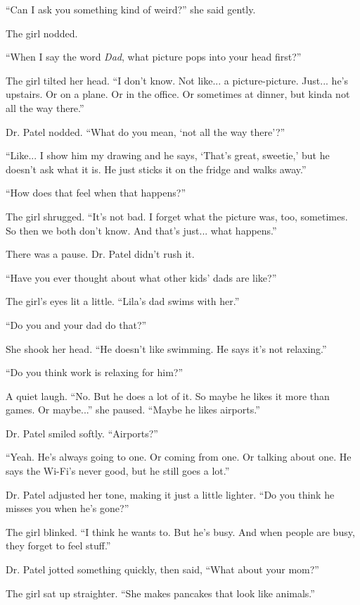``Can I ask you something kind of weird?'' she said gently.

The girl nodded.

``When I say the word \textit{Dad}, what picture pops into your head first?''

The girl tilted her head. ``I don’t know. Not like... a picture-picture. Just... he’s upstairs. Or on a plane. Or in the office. Or sometimes at dinner, but kinda not all the way there.''

Dr. Patel nodded. ``What do you mean, ‘not all the way there’?''

``Like... I show him my drawing and he says, ‘That’s great, sweetie,’ but he doesn’t ask what it is. He just sticks it on the fridge and walks away.''

``How does that feel when that happens?''

The girl shrugged. ``It’s not bad. I forget what the picture was, too, sometimes. So then we both don’t know. And that’s just... what happens.''

There was a pause. Dr. Patel didn’t rush it.

``Have you ever thought about what other kids’ dads are like?''

The girl’s eyes lit a little. ``Lila’s dad swims with her.''

``Do you and your dad do that?''

She shook her head. ``He doesn’t like swimming. He says it's not relaxing.''

``Do you think work is relaxing for him?''

A quiet laugh. ``No. But he does a lot of it. So maybe he likes it more than games. Or maybe...'' 
she paused. ``Maybe he likes airports.''

Dr. Patel smiled softly. ``Airports?''

``Yeah. He’s always going to one. Or coming from one. Or talking about one. He says the Wi-Fi’s never 
good, but he still goes a lot.''

Dr. Patel adjusted her tone, making it just a little lighter. ``Do you think he misses you when he’s gone?''

The girl blinked. ``I think he wants to. But he’s busy. And when people are busy, they forget to feel stuff.''

Dr. Patel jotted something quickly, then said, ``What about your mom?''

The girl sat up straighter. ``She makes pancakes that look like animals.''

